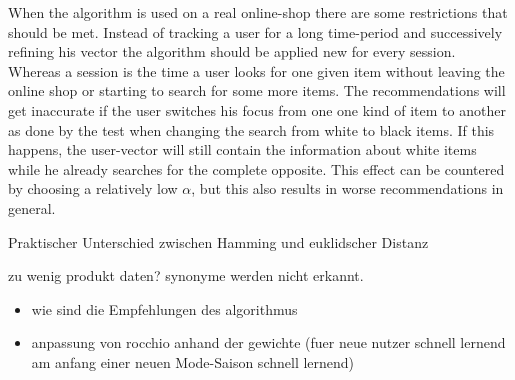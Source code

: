 \noindent
When the algorithm is used on a real online-shop there are some restrictions that should be met.
Instead of tracking a user for a long time-period and successively refining his vector the algorithm should be applied new for every session.
Whereas a session is the time a user looks for one given item without leaving the online shop or starting to search for some more items.
The recommendations will get inaccurate if the user switches his focus from one one kind of item to another as done by the test when changing the search from white to black items.
If this happens, the user-vector will still contain the information about white items while he already searches for the complete opposite.
This effect can be countered by choosing a relatively low $\alpha$, but this also results in worse recommendations in general.



{\color{red}Praktischer Unterschied zwischen Hamming und euklidscher Distanz}




{
\color{red}
zu wenig produkt daten?
synonyme werden nicht erkannt.

}






{\color{red}
    \begin{itemize}
        \item wie sind die Empfehlungen des algorithmus
        \item anpassung von rocchio anhand der gewichte (fuer neue nutzer schnell lernend am anfang einer neuen Mode-Saison schnell lernend)
    \end{itemize}
}

